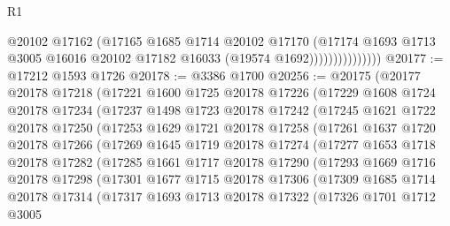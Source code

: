 \begin{lexlean}{R1}
\begin{coremodule}
                            @20102
                            @17162
                            (@17165
                              @1685
                              @1714
                              @20102
                              @17170
                              (@17174
                                @1693
                                @1713
                                @3005
                                @16016
                                @20102
                                @17182
                                @16033
                                (@19574 @1692)))))))))))))))
@20177 := @17212 @1593 @1726
@20178 := @3386 @1700
@20256 := @20175
    (@20177
      @20178
      @17218
      (@17221
        @1600
        @1725
        @20178
        @17226
        (@17229
          @1608
          @1724
          @20178
          @17234
          (@17237
            @1498
            @1723
            @20178
            @17242
            (@17245
              @1621
              @1722
              @20178
              @17250
              (@17253
                @1629
                @1721
                @20178
                @17258
                (@17261
                  @1637
                  @1720
                  @20178
                  @17266
                  (@17269
                    @1645
                    @1719
                    @20178
                    @17274
                    (@17277
                      @1653
                      @1718
                      @20178
                      @17282
                      (@17285
                        @1661
                        @1717
                        @20178
                        @17290
                        (@17293
                          @1669
                          @1716
                          @20178
                          @17298
                          (@17301
                            @1677
                            @1715
                            @20178
                            @17306
                            (@17309
                              @1685
                              @1714
                              @20178
                              @17314
                              (@17317
                                @1693
                                @1713
                                @20178
                                @17322
                                (@17326
                                  @1701
                                  @1712
                                  @3005

\end{coremodule}
\end{lexlean}
